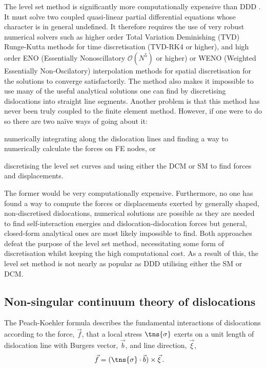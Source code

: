 The level set method is significantly more computationally expensive than DDD \cite{lvl_set_dd}. It must solve two coupled quasi-linear partial differential equations whose character is in general undefined. It therefore requires the use of very robust numerical solvers such as higher order Total Variation Deminishing (TVD) Runge-Kutta methods for time discretisation (TVD-RK4 or higher), and high order ENO (Essentially Nonoscillatory $ \mathcal{O}(N^5) $ or higher) or WENO (Weighted Essentially Non-Oscilatory) interpolation methods for spatial discretisation \cite{lvl_set_ddd_inc} for the solutions to converge satisfactorily. The method also makes it impossible to use many of the useful analytical solutions one can find by discretising dislocations into straight line segments. Another problem is that this method has never been truly coupled to the finite element method. However, if one were to do so there are two naïve ways of going about it:
\begin{inparaenum}
    \item numerically integrating along the dislocation lines and finding a way to numerically calculate the forces on FE nodes, or
    \item discretising the level set curves and using either the DCM or SM to find forces and displacements.
\end{inparaenum}
The former would be very computationally expensive. Furthermore, no one has found a way to compute the forces or displacements exerted by generally shaped, non-discretised dislocations, numerical solutions are possible as they are needed to find self-interaction energies and dislocation-dislocation forces \cite{lvl_set_dd} but general, closed-form analytical ones are most likely impossible to find. Both approaches defeat the purpose of the level set method, necessitating some form of discretisation whilst keeping the high computational cost. As a result of this, the level set method is not nearly as popular as DDD utilising either the SM or DCM.

\subsection{Non-singular continuum theory of dislocations}
\label{ss:non-singular_dln}

The Peach-Koehler formula describes the fundamental interactions of dislocations \cite{pk_force} according to the force, $ \vec{f} $, that a local stress $ \tns{\sigma} $ exerts on a unit length of dislocation line with Burgers vector, $ \vec{b} $, and line direction, $ \vec{\xi} $,
\begin{align}
    \vec{f} & = (\tns{\sigma} \cdot \vec{b}) \times \vec{\xi}\,.
\end{align}

